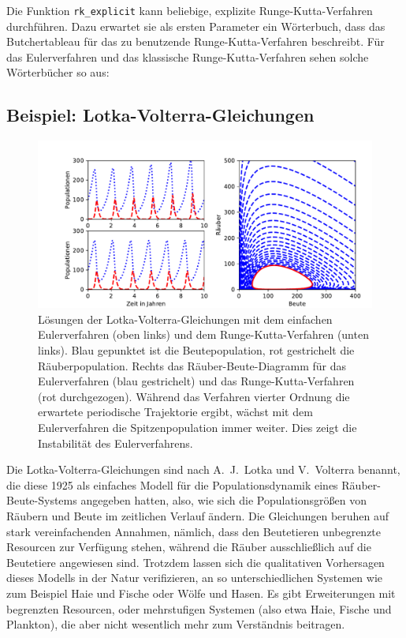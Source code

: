 Die Funktion \lstinline!rk_explicit! kann beliebige, explizite
Runge-Kutta-Verfahren durchführen.  Dazu erwartet sie als ersten
Parameter ein Wörterbuch, dass das Butchertableau für das zu
benutzende Runge-Kutta-Verfahren beschreibt. Für das Eulerverfahren
und das klassische Runge-Kutta-Verfahren sehen solche Wörterbücher so
aus:%
{}%

\subsection{Beispiel: Lotka-Volterra-Gleichungen}

\begin{figure}
  \centering
  \includegraphics[width=\textwidth]{plots/lotka-volterra}
  \caption{Lösungen der Lotka-Volterra-Gleichungen mit dem einfachen
    Eulerverfahren (oben links) und dem Runge-Kutta-Verfahren (unten
    links). Blau gepunktet ist die Beutepopulation, rot gestrichelt
    die Räuberpopulation. Rechts das Räuber-Beute-Diagramm für das
    Eulerverfahren (blau gestrichelt) und das Runge-Kutta-Verfahren
    (rot durchgezogen). Während das Verfahren vierter Ordnung die
    erwartete periodische Trajektorie ergibt, wächst mit dem
    Eulerverfahren die Spitzenpopulation immer weiter. Dies zeigt die
    Instabilität des Eulerverfahrens.}
  \label{fig:lotka}
\end{figure}

Die Lotka-Volterra-Gleichungen sind nach A.~J.~Lotka und V.~Volterra
benannt, die diese 1925 als einfaches Modell für die
Populationsdynamik eines Räuber-Beute-Systems angegeben hatten, also,
wie sich die Populationsgrößen von Räubern und Beute im zeitlichen
Verlauf ändern. Die Gleichungen beruhen auf stark vereinfachenden
Annahmen, nämlich, dass den Beutetieren unbegrenzte Resourcen zur
Verfügung stehen, während die Räuber ausschließlich auf die Beutetiere
angewiesen sind. Trotzdem lassen sich die qualitativen Vorhersagen
dieses Modells in der Natur verifizieren, an so unterschiedlichen
Systemen wie zum Beispiel Haie und Fische oder Wölfe und Hasen.  Es
gibt Erweiterungen mit begrenzten Resourcen, oder mehrstufigen
Systemen (also etwa Haie, Fische und Plankton), die aber nicht
wesentlich mehr zum Verständnis beitragen.

